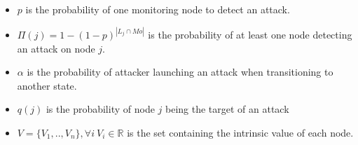 \begin{itemize}
    \item $p$ is the probability of one monitoring node to detect an attack.
    \item  $\Pi(j)=1 - (1-p)^{|L_j\cap Mo|}$ is the probability of at least one node detecting an attack on node $j$.
    \item $\alpha$ is the probability of attacker launching an attack when transitioning to another state.
    \item $q(j)$ is the probability of node $j$ being the target of an attack
    \item $V = \{V_1,..,V_n\}, \forall i~V_i \in \mathbb{R}$ is the set containing the intrinsic value of each node.
\end{itemize}
